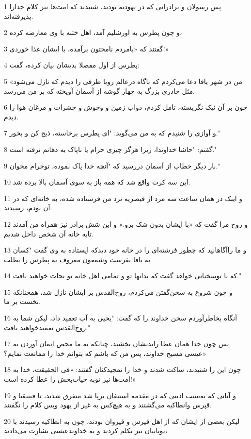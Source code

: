 \par 1 پس رسولان و برادرانی که در یهودیه بودند، شنیدند که امت‌ها نیز کلام خدارا پذیرفته‌اند.
\par 2 و چون پطرس به اورشلیم آمد، اهل ختنه با وی معارضه کرده،
\par 3 گفتند که «بامردم نامختون برآمده، با ایشان غذا خوردی!»
\par 4 پطرس از اول مفصلا بدیشان بیان کرده، گفت:
\par 5 «من در شهر یافا دعا می‌کردم که ناگاه درعالم رویا ظرفی را دیدم که نازل می‌شود مثل چادری بزرگ به چهار گوشه از آسمان آویخته که بر من می‌رسد.
\par 6 چون بر آن نیک نگریسته، تامل کردم، دواب زمین و وحوش و حشرات و مرغان هوا را دیدم.
\par 7 و آوازی را شنیدم که به من می‌گوید: "ای پطرس برخاسته، ذبح کن و بخور."
\par 8 گفتم: "حاشا خداوندا، زیرا هرگز چیزی حرام یا ناپاک به دهانم نرفته است."
\par 9 بار دیگر خطاب از آسمان در‌رسید که "آنچه خدا پاک نموده، توحرام مخوان."
\par 10 این سه کرت واقع شد که همه باز به سوی آسمان بالا برده شد.
\par 11 و اینک در همان ساعت سه مرد از قیصریه نزد من فرستاده شده، به خانه‌ای که در آن بودم، رسیدند.
\par 12 و روح مرا گفت که «با ایشان بدون شک برو.» و این شش برادر نیز همراه من آمدند تابه خانه آن شخص داخل شدیم.
\par 13 و ما راآگاهانید که چطور فرشته‌ای را در خانه خود دیدکه ایستاده به وی گفت "کسان به یافا بفرست وشمعون معروف به پطرس را بطلب
\par 14 که با توسخنانی خواهد گفت که بدانها تو و تمامی اهل خانه تو نجات خواهید یافت."
\par 15 و چون شروع به سخن‌گفتن می‌کردم، روح‌القدس بر ایشان نازل شد، همچنانکه نخست بر ما.
\par 16 آنگاه بخاطرآوردم سخن خداوند را که گفت: "یحیی به آب تعمید داد، لیکن شما به روح‌القدس تعمیدخواهید یافت."
\par 17 پس چون خدا همان عطا رابدیشان بخشید، چنانکه به ما محض ایمان آوردن به عیسی مسیح خداوند، پس من که باشم که بتوانم خدا را ممانعت نمایم؟»
\par 18 چون این را شنیدند، ساکت شدند و خدا را تمجیدکنان گفتند: «فی الحقیقت، خدا به امت‌ها نیز توبه حیات‌بخش را عطا کرده است!»
\par 19 و آنانی که به‌سبب اذیتی که در مقدمه استیفان برپا شد متفرق شدند، تا فینیقیا و قپرس وانطاکیه می‌گشتند و به هیچ‌کس به غیر از یهود وبس کلام را نگفتند.
\par 20 لیکن بعضی از ایشان که از اهل قپرس و قیروان بودند، چون به انطاکیه رسیدند با یونانیان نیز تکلم کردند و به خداوندعیسی بشارت می‌دادند،
